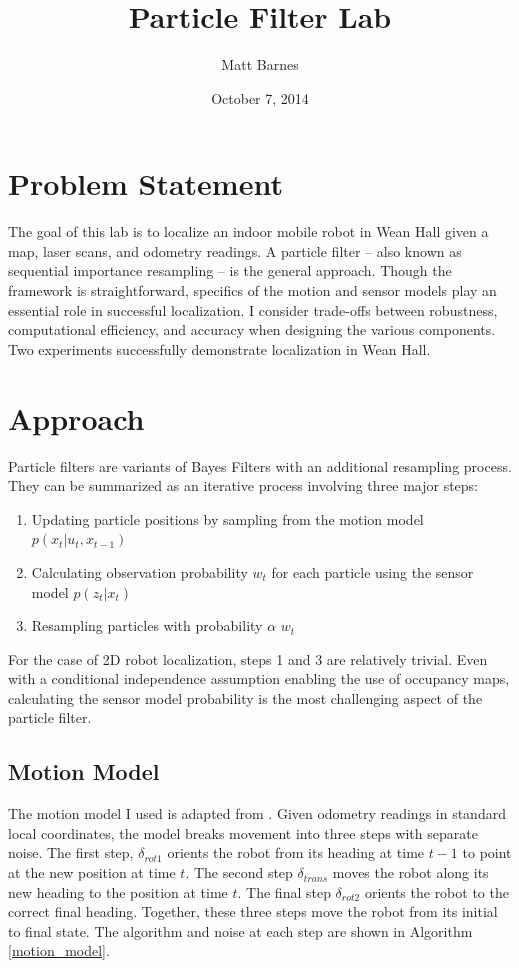 \documentclass[11pt]{amsart}
\title{Particle Filter Lab}
\author{Matt Barnes}
\date{October 7, 2014}                                           %
\begin{document}
\maketitle
\section{Problem Statement}
The goal of this lab is to localize an indoor mobile robot in Wean Hall given a map, laser scans, and odometry readings. A particle filter -- also known as sequential importance resampling -- is the general approach. Though the framework is straightforward, specifics of the motion and sensor models play an essential role in successful localization. I consider trade-offs between robustness, computational efficiency, and accuracy when designing the various components. Two experiments successfully demonstrate localization in Wean Hall.

\section{Approach}
Particle filters are variants of Bayes Filters with an additional resampling process. They can be summarized as an iterative process involving three major steps:

\begin{enumerate}
\item Updating particle positions by sampling from the motion model $p(x_t | u_t, x_{t-1})$
\item Calculating observation probability $w_t$ for each particle using the sensor model $p(z_t | x_t)$
\item Resampling particles with probability $\alpha$ $w_t$
\end{enumerate}

For the case of 2D robot localization, steps 1 and 3 are relatively trivial. Even with a conditional independence assumption enabling the use of occupancy maps, calculating the sensor model probability is the most challenging aspect of the particle filter.

\subsection{Motion Model}
The motion model I used is adapted from \cite{thrun2005probabilistic}. Given odometry readings in standard local coordinates, the model breaks movement into three steps with separate noise. The first step, $\delta_{rot1}$ orients the robot from its heading at time $t-1$ to point at the new position at time $t$. The second step $\delta_{trans}$ moves the robot along its new heading to the position at time $t$. The final step $\delta_{rot2}$ orients the robot to the correct final heading. Together, these three steps move the robot from its initial to final state. The algorithm and noise at each step are shown in Algorithm \ref{motion_model}.
\end{document}
